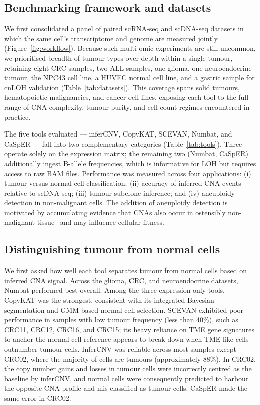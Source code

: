 \documentclass[11pt]{article}
\begin{document}
\subsection{Benchmarking framework and datasets}

We first consolidated a panel of paired scRNA-seq and scDNA-seq datasets in
which the same cell's transcriptome and genome are measured jointly
(Figure~\ref{fig:workflow}). Because such multi-omic experiments are still
uncommon, we prioritised breadth of tumour types over depth within a single
tumour, retaining eight CRC samples, two ALL samples, one glioma, one
neuroendocrine tumour, the NPC43 cell line, a HUVEC normal cell line, and a
gastric sample for cnLOH validation (Table~\ref{tab:datasets}). This coverage spans solid tumours,
hematopoietic malignancies, and cancer cell lines, exposing each tool to the
full range of CNA complexity, tumour purity, and cell-count regimes
encountered in practice.

The five tools evaluated --- inferCNV, CopyKAT, SCEVAN, Numbat, and CaSpER
--- fall into two complementary categories (Table~\ref{tab:tools}). Three
operate solely on the expression matrix; the remaining two (Numbat, CaSpER)
additionally ingest B-allele frequencies, which is informative for LOH but
requires access to raw BAM files. Performance was measured across four
applications: (i) tumour versus normal cell classification; (ii) accuracy of
inferred CNA events relative to scDNA-seq; (iii) tumour subclone inference;
and (iv) aneuploidy detection in non-malignant cells. The addition of
aneuploidy detection is motivated by accumulating evidence that CNAs also
occur in ostensibly non-malignant tissue~\cite{zhou2020singlecell} and may
influence cellular fitness.

\subsection{Distinguishing tumour from normal cells}

We first asked how well each tool separates tumour from normal cells based
on inferred CNA signal. Across the glioma, CRC, and neuroendocrine datasets,
Numbat performed best overall. Among the three expression-only tools,
CopyKAT was the strongest, consistent with its integrated Bayesian
segmentation and GMM-based normal-cell selection. SCEVAN exhibited poor
performance in samples with low tumour frequency (less than 40\%), such as
CRC11, CRC12, CRC16, and CRC15; its heavy reliance on TME gene signatures to
anchor the normal-cell reference appears to break down when TME-like cells
outnumber tumour cells. InferCNV was reliable across most samples except
CRC02, where the majority of cells are tumours (approximately 88\%). In
CRC02, the copy number gains and losses in tumour cells were incorrectly
centred as the baseline by inferCNV, and normal cells were consequently
predicted to harbour the opposite CNA profile and mis-classified as tumour
cells. CaSpER made the same error in CRC02.
\end{document}
